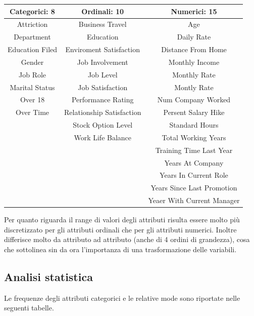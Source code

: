 \documentclass[a4paper,9pt]{article}
\begin{document}
\begin{center}
\begin{tabular}{c|c|c}
\toprule
\bfseries Categorici: 8 &\bfseries Ordinali: 10 & \bfseries Numerici: 15 \\
\midrule
Attriction & Business Travel & Age \\
Department & Education & Daily Rate \\
Education Filed & Enviroment Satisfaction & Distance From Home \\
Gender & Job Involvement & Monthly Income \\
Job Role & Job Level & Monthly Rate\\
Marital Status & Job Satisfaction & Montly Rate\\
Over 18 & Performance Rating & Num Company Worked\\
Over Time & Relationship Satisfaction & Persent Salary Hike\\
& Stock Option Level & Standard Hours\\
& Work Life Balance & Total Working Years\\
& &Training Time Last Year\\
& & Years At Company\\
& & Years In Current Role\\
& & Years Since Last Promotion\\
& & Yeaer With Current Manager\\
\bottomrule 
\end{tabular}
\end{center}

Per quanto riguarda il range di valori degli attributi risulta essere molto più discretizzato per gli attributi ordinali che per gli attributi numerici. Inoltre differisce molto da attributo ad attributo (anche di 4 ordini di grandezza), cosa che sottolinea sin da  ora l'importanza di una trasformazione delle variabili.

\subsection{Analisi statistica}
Le frequenze degli attributi categorici e le relative mode sono riportate nelle seguenti tabelle.
\end{document}
